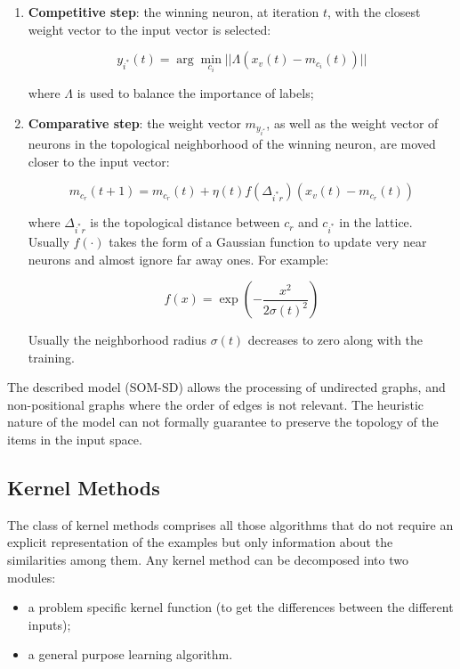 \begin{enumerate}[label=Step \arabic*:]
	\item \textbf{Competitive step}: the winning neuron, at
		iteration $t$, with the closest weight vector to the input vector
		is selected:

		\begin{equation}
			y_{i^*}(t) = \arg \min_{c_i} || \Lambda (x_v(t) - m_{c_i}(t))||
		\end{equation}

		where $\Lambda$ is used to balance the importance of labels;

	\item \textbf{Comparative step}: the weight vector $m_{y_{i^*}}$, as well as
		the weight vector of neurons in the topological neighborhood of the 
		winning neuron, are moved closer to the input vector:

		\begin{equation}
			m_{c_r}(t+1) = m_{c_r}(t) + \eta (t)f(\Delta_{i^*r})(x_v(t)-m_{c_r}(t))
		\end{equation}

		where $\Delta_{i^*r}$ is the topological distance between $c_r$ and
		$c_{i^*}$ in the lattice. Usually $f(\cdot)$ takes the form of a
		Gaussian function to update very near neurons and almost ignore far away
		ones. For example:

		\begin{equation}
			f(x) = \exp\left(-\frac{x^2}{2\sigma(t)^2}\right)
		\end{equation}

		Usually the neighborhood radius $\sigma(t)$ decreases to zero along with
		the training.
\end{enumerate}

The described model (SOM-SD) allows the processing of undirected graphs, and
non-positional  graphs where the order of edges is not relevant. The heuristic
nature of the model can not formally guarantee to preserve the topology of the
items in the input space.

\subsection{Kernel Methods}

The class of kernel methods comprises all those algorithms that do not require
an explicit representation of the examples but only information about the
similarities among them. Any kernel method can be decomposed into two modules:
\begin{itemize}
	\item a problem specific kernel function (to get the differences between the
		different inputs);

	\item a general purpose learning algorithm.
\end{itemize}

